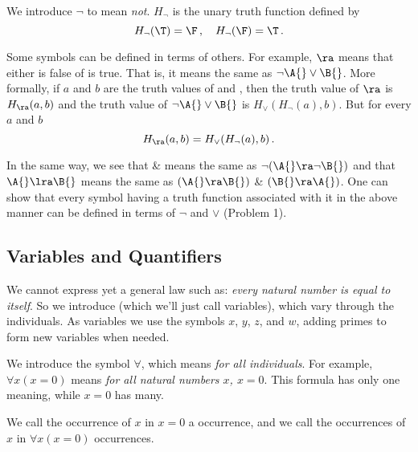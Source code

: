 We introduce $\neg$ to mean \emph{not}.
$H_\neg$ is the unary truth function defined by
\begin{equation}
    H_\neg(\T) = \F\,, \quad H_\neg(\F) = \T\,.
\end{equation}

Some symbols can be defined in terms of others.
For example, \A $\ra$ \B{} means that either \A{} is false of \B{} is true.
That is, it means the same as $\neg \A{} \vee \B{}$.
More formally, if $a$ and $b$ are the truth values of \A{} and \B{}, then the truth value of \A $\ra$ \B{} is $H_\ra(a,b)$ and the truth value of $\neg \A{} \vee \B{}$ is $H_\vee(H_\neg(a),b)$.
But for every $a$ and $b$
\begin{equation}
    H_\ra(a,b) = H_\vee(H_\neg(a),b)\,.
\end{equation}

In the same way, we see that \A{} \& \B{} means the same as $\neg(\A{} \ra \neg \B{})$ and that $\A{} \lra \B{}$ means the same as $(\A{} \ra \B{})$ \& $(\B{} \ra \A{})$.
One can show that every symbol having a truth function associated with it in the above manner can be defined in terms of $\neg$ and $\vee$ (Problem 1).


\subsection{Variables and Quantifiers}


We cannot express yet a general law such as: \emph{every natural number is equal to itself}.
So we introduce  (which we'll just call variables), which vary through the individuals.
As variables we use the symbols $x$, $y$, $z$, and $w$, adding primes to form new variables when needed.


We introduce the symbol $\forall$, which means \emph{for all individuals}.
For example, $\forall x (x = 0)$ means \emph{for all natural numbers $x$, $x = 0$}.
This formula has only one meaning, while $x = 0$ has many.

We call the occurrence of $x$ in $x = 0$ a  occurrence, and we call the occurrences of $x$ in $\forall x (x = 0)$  occurrences.

